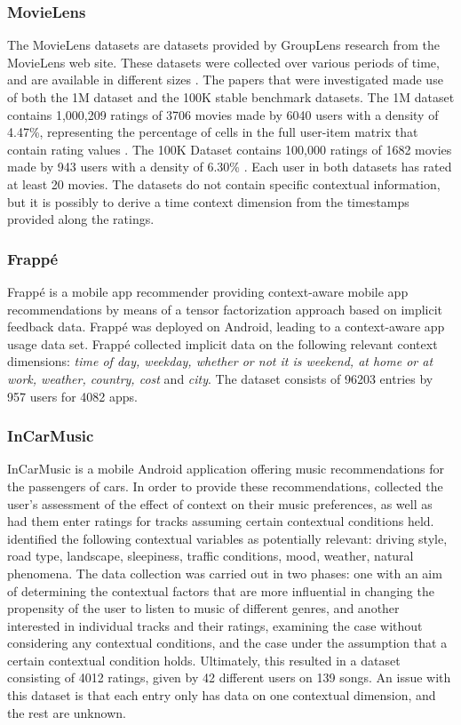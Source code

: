 \subsubsection{MovieLens}
The MovieLens datasets are datasets provided by GroupLens research from the MovieLens web site.
These datasets were collected over various periods of time, and are available in different sizes \cite{movielens}.
The papers that were investigated made use of both the 1M dataset and the 100K stable benchmark datasets.
The 1M dataset contains 1,000,209 ratings of 3706 movies made by 6040 users with a density of 4.47\%, representing the percentage of cells in the full user-item matrix that contain rating values \cite{MovieLens2015}.
The 100K Dataset contains 100,000 ratings of 1682 movies made by 943 users with a density of 6.30\% \cite{MovieLens2015}.
Each user in both datasets has rated at least 20 movies.
The datasets do not contain specific contextual information, but it is possibly to derive a time context dimension from the timestamps provided along the ratings.

\subsubsection{Frappé}
Frappé is a mobile app recommender providing context-aware mobile app recommendations by means of a tensor factorization approach based on implicit feedback data\cite{baltrunas2015frappe}.
Frappé was deployed on Android, leading to a context-aware app usage data set.
Frappé collected implicit data on the following relevant context dimensions: \textit{time of day, weekday, whether or not it is weekend, at home or at work, weather, country, cost} and \textit{city}. 
The dataset consists of 96203 entries by 957 users for 4082 apps.

\subsubsection{InCarMusic}
InCarMusic is a mobile Android application offering music recommendations for the passengers of cars.
In order to provide these recommendations, \cite{InCarMusic2011} collected the user's assessment of the effect of context on their music preferences, as well as had them enter ratings for tracks assuming certain contextual conditions held.
\cite{InCarMusic2011} identified the following contextual variables as potentially relevant: driving style, road type, landscape, sleepiness, traffic conditions, mood, weather, natural phenomena.
The data collection was carried out in two phases: one with an aim of determining the contextual factors that are more influential in changing the propensity of the user to listen to music of different genres, and another interested in individual tracks and their ratings, examining the case without considering any contextual conditions, and the case under the assumption that a certain contextual condition holds.
Ultimately, this resulted in a dataset consisting of 4012 ratings, given by 42 different users on 139 songs.
An issue with this dataset is that each entry only has data on one contextual dimension, and the rest are unknown.

